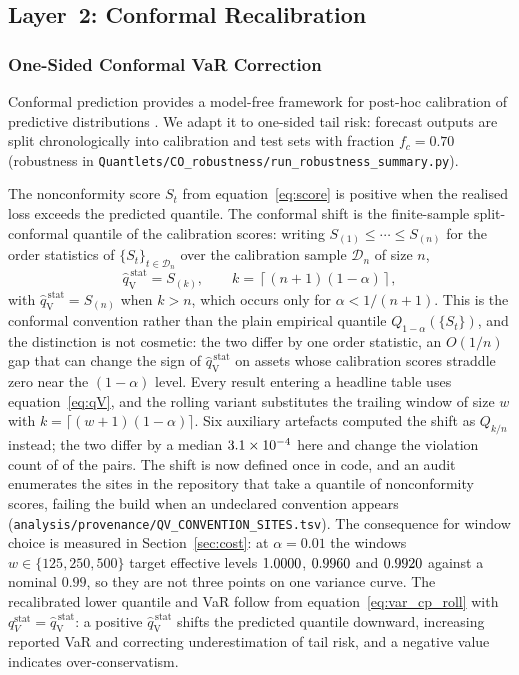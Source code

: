 \documentclass[preprint,11pt,authoryear]{elsarticle}
\newcommand{\1}{\boldsymbol{1}}
\newcommand{\qVstat}{\hat{q}_{\scriptscriptstyle\mathrm{V}}^{\,\mathrm{stat}}}
\begin{document}
\subsection{Layer~2: Conformal Recalibration}
\label{sec:layer2}

\subsubsection{One-Sided Conformal VaR Correction}
\label{sec:cqr_var}

Conformal prediction provides a model-free framework for post-hoc calibration of predictive distributions \citep{vovk2005algorithmic,romano2019conformalized}. We adapt it to one-sided tail risk: forecast outputs are split chronologically into calibration and test sets with fraction $f_c = 0.70$ (robustness in \texttt{Quantlets/CO\_robustness/run\_robustness\_summary.py}).

The nonconformity score $S_t$ from equation~\eqref{eq:score} is positive when the realised loss exceeds the predicted quantile. The conformal shift is the finite-sample split-conformal quantile of the calibration scores: writing $S_{(1)} \leq \cdots \leq S_{(n)}$ for the order statistics of $\{S_t\}_{t\in\mathcal D_n}$ over the calibration sample $\mathcal D_n$ of size $n$,
\begin{equation}
	\label{eq:qV}
	\qVstat
	= S_{(k)},
	\qquad
	k = \left\lceil (n+1)(1-\alpha) \right\rceil,
\end{equation}
with $\qVstat = S_{(n)}$ when $k > n$, which occurs only for $\alpha < 1/(n+1)$.
This is the conformal convention rather than the plain empirical quantile
$Q_{1-\alpha}(\{S_t\})$, and the distinction is not cosmetic: the two differ by
one order statistic, an $O(1/n)$ gap that can change the sign of $\qVstat$ on
assets whose calibration scores straddle zero near the $(1-\alpha)$ level. Every
result entering a headline table uses equation~\eqref{eq:qV}, and the rolling
variant substitutes the trailing window of size $w$ with
$k = \lceil (w+1)(1-\alpha)\rceil$. Six auxiliary artefacts computed the shift as
$Q_{k/n}$ instead; the two differ by a median $3.1\times 10^{-4}$ here and
change the violation count of \nSeqLevelChanged{} of the \nSeqPairs{} pairs. The
shift is now defined once in code, and an audit enumerates the \nQVSites{} sites
in the repository that take a quantile of nonconformity scores, failing the build
when an undeclared convention appears
(\texttt{analysis/provenance/QV\_CONVENTION\_SITES.tsv}). The consequence for
window choice is measured in Section~\ref{sec:cost}: at $\alpha = 0.01$ the
windows $w \in \{125, 250, 500\}$ target effective levels $1.0000$,
$0.9960$ and $0.9920$ against a nominal $0.99$, so they are
not three points on one variance curve. The recalibrated lower quantile and VaR
follow from equation~\eqref{eq:var_cp_roll} with $q_V^{\mathrm{stat}} = \qVstat$:
a positive $\qVstat$ shifts the predicted quantile downward, increasing reported
VaR and correcting underestimation of tail risk, and a negative value indicates
over-conservatism.
\end{document}
